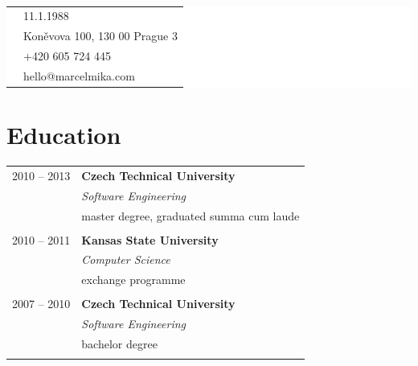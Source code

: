 \documentclass[10pt]{article} %
\begin{document}
{\begin{minipage}[t]{0.5\textwidth}
\hspace{3pt}
\begin{minipage}{\textwidth} %
\raggedright
\mbox{}\\[-40pt]
\colorbox{white}{\textcolor{text1}{
\begin{tabular}{c|p{\textwidth}}
\raisebox{0pt}{\textborn} & 11.1.1988 \\ %
\raisebox{-1pt}{\textifsymbol{18}} & Koněvova 100, 130 00 Prague 3 \\ %
\raisebox{0pt}{\Telefon} & +420 605 724 445 \\ %
\raisebox{0pt}{\Letter} & hello@marcelmika.com \\ %
\end{tabular}
}}
\end{minipage}%


\hspace{5pt}
\section{Education} 
\medskip
\begin{tabular}{@{}rl@{}} 


\small\textsc{2010 -- 2013} & \large\textbf{Czech Technical University} \\ 
& \normalsize\textit{Software Engineering} \\ 
& \small master degree, graduated summa cum laude \\ 
&\\


\small\textsc{2010 -- 2011} & \large\textbf{Kansas State University} \\ 
& \normalsize\textit{Computer Science} \\ 
& \small exchange programme \\ 
&\\
	 

\small\textsc{2007 -- 2010} & \large\textbf{Czech Technical University} \\ 
& \normalsize\textit{Software Engineering} \\ 
& \small bachelor degree \\ 
&\\


\end{tabular}
\end{minipage}}
\end{document}
